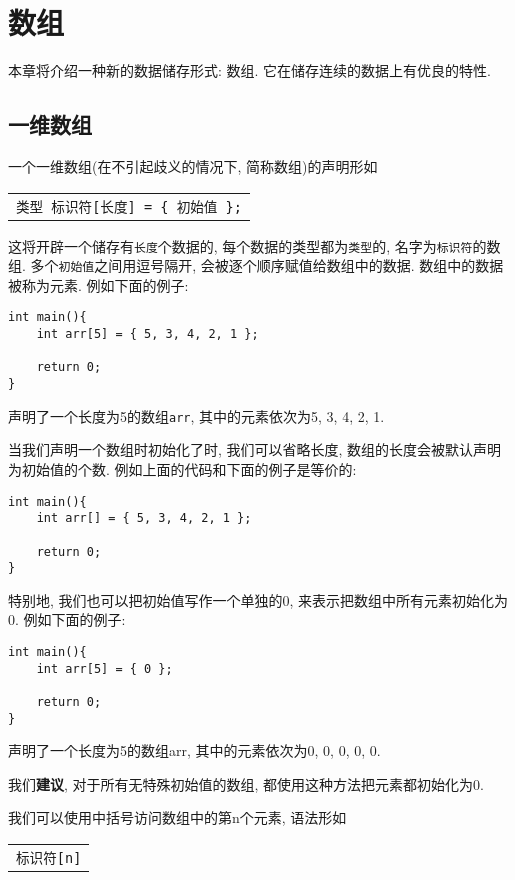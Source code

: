 \chapter{数组} \label{数组}
    本章将介绍一种新的数据储存形式: 数组. 它在储存连续的数据上有优良的特性.

    \section{一维数组}
        一个一维数组(在不引起歧义的情况下, 简称数组)的声明形如
        \begin{center}
        \begin{longtable}{l}
            \texttt{类型~标识符\hspace*{-0.25pt}[长度] = \{~初始值~\};}
        \end{longtable}
        \end{center}

        这将开辟一个储存有\texttt{长度}个数据的, 每个数据的类型都为\texttt{类型}的, 名字为\texttt{标识符}的数组. 多个\texttt{初始值}之间用逗号隔开, 会被逐个顺序赋值给数组中的数据. 数组中的数据被称为元素. 例如下面的例子:
\begin{lstlisting}
int main(){
    int arr[5] = { 5, 3, 4, 2, 1 };

    return 0;
}
\end{lstlisting}
        声明了一个长度为5的数组\texttt{arr}, 其中的元素依次为5, 3, 4, 2, 1.

        当我们声明一个数组时初始化了时, 我们可以省略长度, 数组的长度会被默认声明为初始值的个数. 例如上面的代码和下面的例子是等价的:
\begin{lstlisting}
int main(){
    int arr[] = { 5, 3, 4, 2, 1 };

    return 0;
}
\end{lstlisting}

        特别地, 我们也可以把初始值写作一个单独的0, 来表示把数组中所有元素初始化为0. 例如下面的例子:
\begin{lstlisting}
int main(){
    int arr[5] = { 0 };

    return 0;
}
\end{lstlisting}
        声明了一个长度为5的数组arr, 其中的元素依次为0, 0, 0, 0, 0.

        我们\textbf{建议}, 对于所有无特殊初始值的数组, 都使用这种方法把元素都初始化为0.

        我们可以使用中括号访问数组中的第n个元素, 语法形如
        \begin{center}
        \begin{longtable}{l}
            \texttt{标识符\hspace*{-0.25pt}[n]}
        \end{longtable}
        \end{center}

